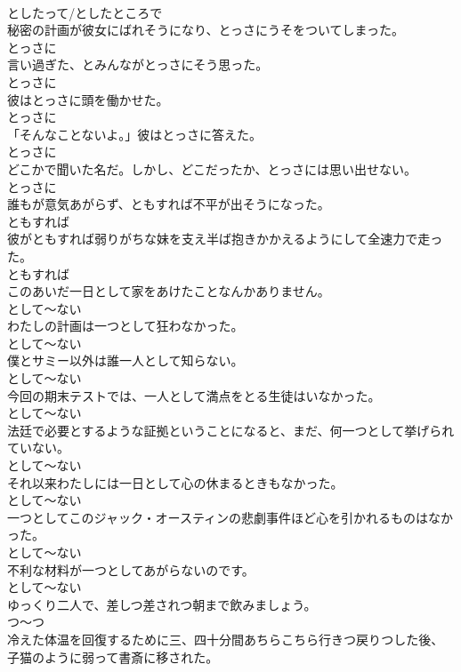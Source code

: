 \documentclass[8pt]{extreport}
\begin{document}
\begin{CJK}{UTF8}{min}
\\	としたって/としたところで
\\	秘密の計画が彼女にばれそうになり、とっさにうそをついてしまった。	
\\	とっさに
\\	言い過ぎた、とみんながとっさにそう思った。	
\\	とっさに
\\	彼はとっさに頭を働かせた。	
\\	とっさに
\\	「そんなことないよ。」彼はとっさに答えた。	
\\	とっさに
\\	どこかで聞いた名だ。しかし、どこだったか、とっさには思い出せない。	
\\	とっさに
\\	誰もが意気あがらず、ともすれば不平が出そうになった。	
\\	ともすれば
\\	彼がともすれば弱りがちな妹を支え半ば抱きかかえるようにして全速力で走った。	
\\	ともすれば
\\	このあいだ一日として家をあけたことなんかありません。	
\\	として～ない
\\	わたしの計画は一つとして狂わなかった。	
\\	として～ない
\\	僕とサミー以外は誰一人として知らない。	
\\	として～ない
\\	今回の期末テストでは、一人として満点をとる生徒はいなかった。	
\\	として～ない
\\	法廷で必要とするような証拠ということになると、まだ、何一つとして挙げられていない。	
\\	として～ない
\\	それ以来わたしには一日として心の休まるときもなかった。	
\\	として～ない
\\	一つとしてこのジャック・オースティンの悲劇事件ほど心を引かれるものはなかった。	
\\	として～ない
\\	不利な材料が一つとしてあがらないのです。	
\\	として～ない
\\	ゆっくり二人で、差しつ差されつ朝まで飲みましょう。	
\\	つ～つ
\\	冷えた体温を回復するために三、四十分間あちらこちら行きつ戻りつした後、子猫のように弱って書斎に移された。	

\end{CJK}
\end{document}
